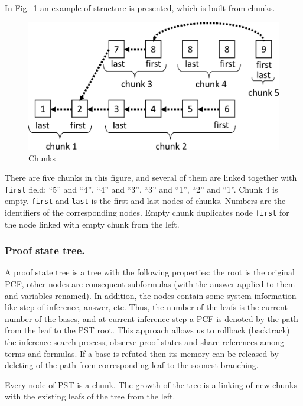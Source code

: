 \documentclass[runningheads,a4paper]{llncs}
\begin{document}
In Fig.~\ref{fig:chunk1} an example of structure is presented, which is built from chunks.
\begin{figure}[h]
  \vspace{0.5cm}
  \centering
  \includegraphics[width=0.6\linewidth]{img/ChunkFullp1.eps}
  \caption{Chunks}
  \label{fig:chunk1}
\end{figure}
There are five chunks in this figure, and several of them are linked together with \texttt{first} field: ``5'' and ``4'', ``4'' and ``3'', ``3'' and ``1'', ``2'' and ``1''. Chunk 4 is empty. \texttt{first} and \texttt{last} is the first and last nodes of chunks. Numbers are the identifiers of the corresponding nodes. Empty chunk duplicates node \texttt{first} for the node linked with empty chunk from the left.


\subsubsection{Proof state tree.}
A proof state tree is a tree with the following properties: the root is the original PCF, other nodes are consequent subformulas (with the answer applied to them and variables renamed). In addition, the nodes contain some system information like step of inference, answer, etc. Thus, the number of the leafs is the current number of the bases, and at current inference step a PCF is denoted by the path from the leaf to the PST root. This approach allows us to rollback (backtrack) the inference search process, observe proof states and share references among terms and formulas. If a base is refuted then its memory can be released by deleting of the path from corresponding leaf to the soonest branching.

Every node of PST is a chunk. The growth of the tree is a linking of new chunks with the existing leafs of the tree from the left.
\end{document}
